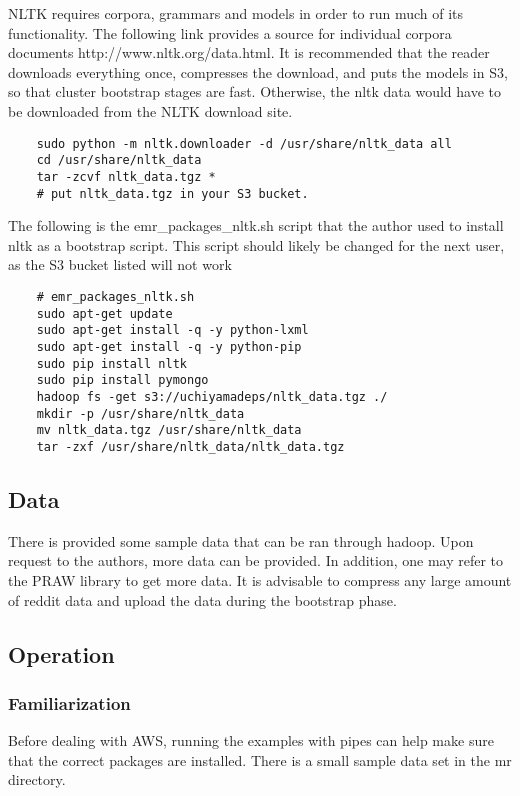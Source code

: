 \documentclass[12pt,a4paper]{article}
\begin{document}
NLTK requires corpora, grammars and models in order to run
much of its functionality. The following link provides a source for individual corpora documents http://www.nltk.org/data.html. It is recommended that the 
reader downloads everything once, compresses the download, and
puts the models in S3, so that cluster bootstrap
stages are fast. Otherwise, the nltk data would have to be
downloaded from the NLTK download site.

\begin{lstlisting}
	sudo python -m nltk.downloader -d /usr/share/nltk_data all
	cd /usr/share/nltk_data
	tar -zcvf nltk_data.tgz *
	# put nltk_data.tgz in your S3 bucket.
\end{lstlisting}

The following is the emr\_packages\_nltk.sh script that the author
used to install nltk as a bootstrap script. This script
should likely be changed for the next user, as the
S3 bucket listed will not work

\begin{lstlisting}
	# emr_packages_nltk.sh
	sudo apt-get update
	sudo apt-get install -q -y python-lxml
	sudo apt-get install -q -y python-pip
	sudo pip install nltk
	sudo pip install pymongo
	hadoop fs -get s3://uchiyamadeps/nltk_data.tgz ./
	mkdir -p /usr/share/nltk_data
	mv nltk_data.tgz /usr/share/nltk_data
	tar -zxf /usr/share/nltk_data/nltk_data.tgz
\end{lstlisting}


\subsection{Data}

There is provided some sample data that can be ran through
hadoop. Upon request to the authors, more data
can be provided. In addition, one may refer to the PRAW
library to get more data. It is advisable to
compress any large amount of reddit data and upload
the data during the bootstrap phase.

\subsection{Operation}

\subsubsection{Familiarization}

Before dealing with AWS, running the examples
with pipes can help make sure that the correct packages
are installed. There is a small sample data set in the mr directory.
\end{document}
